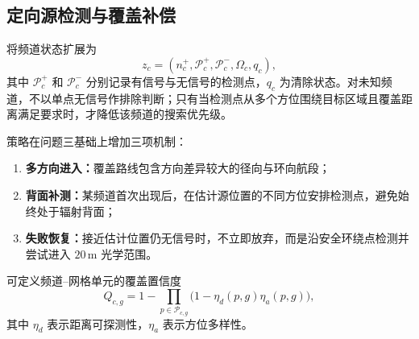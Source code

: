 \subsection{定向源检测与覆盖补偿}

将频道状态扩展为
\[
  z_c=(n_c^{+},\mathcal{P}_c^{+},\mathcal{P}_c^{-},\Omega_c,q_c),
\]
其中 \(\mathcal{P}_c^{+}\) 和 \(\mathcal{P}_c^{-}\) 分别记录有信号与无信号的检测点，\(q_c\) 为清除状态。对未知频道，不以单点无信号作排除判断；只有当检测点从多个方位围绕目标区域且覆盖距离满足要求时，才降低该频道的搜索优先级。

策略在问题三基础上增加三项机制：
\begin{enumerate}
  \item \textbf{多方向进入：}覆盖路线包含方向差异较大的径向与环向航段；
  \item \textbf{背面补测：}某频道首次出现后，在估计源位置的不同方位安排检测点，避免始终处于辐射背面；
  \item \textbf{失败恢复：}接近估计位置仍无信号时，不立即放弃，而是沿安全环绕点检测并尝试进入 \(20\,\mathrm{m}\) 光学范围。
\end{enumerate}

可定义频道--网格单元的覆盖置信度
\begin{equation}
  Q_{c,g}=1-\prod_{p\in\mathcal{P}_{c,g}}
  \bigl(1-\eta_d(p,g)\eta_a(p,g)\bigr),
\end{equation}
其中 \(\eta_d\) 表示距离可探测性，\(\eta_a\) 表示方位多样性。
